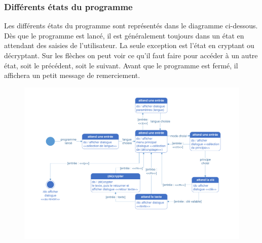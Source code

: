 \documentclass[a4paper,12pt,abstracton,titlepage]{scrartcl}
\begin{document}
{\subsubsection{Différents états du programme}
Les différents états du programme sont représentés dans le diagramme ci-dessous. Dès que le programme est lancé, il est généralement toujours dans un état en attendant des saisies de l'utilisateur. La seule exception est l'état en cryptant ou décryptant.
Sur les flèches on peut voir ce qu'il faut faire pour accéder à un autre état, soit le précédent, soit le suivant.
Avant que le programme est fermé, il affichera un petit message de remerciement.\\

\begin{figure}[tpbh]
	\centering
  \includegraphics[width=\textwidth, trim=20mm 25mm 25mm 13mm, clip]{./Diagrammes/diagrammeDesEtats.pdf}
	\label{img:etats}
\end{figure}


\newpage
}
\end{document}

